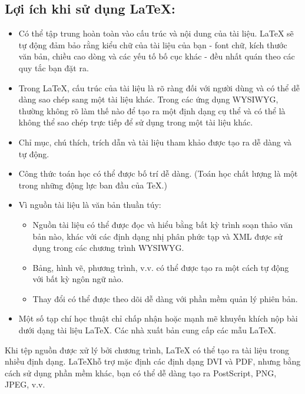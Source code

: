 \documentclass[a4paper,12pt]{article}
\begin{document}
\subsection*{Lợi ích khi sử dụng \LaTeX:}
\begin{itemize}

\item Có thể tập trung hoàn toàn vào cấu trúc và nội dung của tài liệu. \LaTeX{} sẽ tự động đảm bảo rằng kiểu chữ của tài liệu của bạn - font chữ, kích thước văn bản, chiều cao dòng và các yếu tố bố cục khác - đều nhất quán theo các quy tắc bạn đặt ra.
\item Trong \LaTeX, cấu trúc của tài liệu là rõ ràng đối với người dùng và có thể dễ dàng sao chép sang một tài liệu khác. Trong các ứng dụng WYSIWYG, thường không rõ làm thế nào để tạo ra một định dạng cụ thể và có thể là không thể sao chép trực tiếp để sử dụng trong một tài liệu khác.
\item Chỉ mục, chú thích, trích dẫn và tài liệu tham khảo được tạo ra dễ dàng và tự động.
\item Công thức toán học có thể được bố trí dễ dàng. (Toán học chất lượng là một trong những động lực ban đầu của \TeX.)
\item Vì nguồn tài liệu là văn bản thuần túy:
	\begin{itemize}
		\item Nguồn tài liệu có thể được đọc và hiểu bằng bất kỳ trình soạn thảo văn bản nào, khác với các định dạng nhị phân phức tạp và XML được sử dụng trong các chương trình WYSIWYG.
		\item Bảng, hình vẽ, phương trình, v.v. có thể được tạo ra một cách tự động với bất kỳ ngôn ngữ nào.
		\item Thay đổi có thể được theo dõi dễ dàng với phần mềm quản lý phiên bản.
	\end{itemize}
\item Một số tạp chí học thuật chỉ chấp nhận hoặc mạnh mẽ khuyến khích nộp bài dưới dạng tài liệu \LaTeX. Các nhà xuất bản cung cấp các mẫu \LaTeX.

\end{itemize}
Khi tệp nguồn được xử lý bởi chương trình, \LaTeX{} có thể tạo ra tài liệu trong nhiều định dạng. \LaTeX hỗ trợ mặc định các định dạng DVI và PDF, nhưng bằng cách sử dụng phần mềm khác, bạn có thể dễ dàng tạo ra PostScript, PNG, JPEG, v.v.\newline
\end{document}
